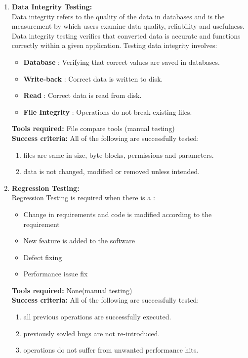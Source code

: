 \begin{enumerate}
\item \textbf{Data Integrity Testing:} \\
Data integrity refers to the quality of the data in databases and is the measurement by which users examine data quality, reliability and usefulness. Data integrity testing verifies that converted data is accurate and functions correctly within a given application. Testing data integrity involves:
\begin{itemize}
\item \textbf{Database} : Verifying that correct values are saved in databases.
\item \textbf{Write-back} : Correct data is written to disk.
\item \textbf{Read} : Correct data is read from disk.
\item \textbf{File Integrity} : Operations do not break existing files.
\end{itemize}
\textbf{Tools required:} File compare tools (manual testing) \\
\textbf{Success criteria:} All of the following are successfully tested:
\begin{enumerate}
\item files are same in size, byte-blocks, permissions and parameters.
\item data is not changed, modified or removed unless intended.
\end{enumerate}

\item \textbf{Regression Testing:} \\
Regression Testing is required when there is a :
\begin{itemize}
\item Change in requirements and code is modified according to the requirement
\item New feature is added to the software
\item Defect fixing
\item Performance issue fix 
\end{itemize}
\textbf{Tools required:} None(manual testing) \\
\textbf{Success criteria:} All of the following are successfully tested:
\begin{enumerate}
\item all previous operations are successfully executed.
\item previously sovled bugs are not re-introduced.
\item operations do not suffer from unwanted performance hits.
\end{enumerate}


\end{enumerate}
